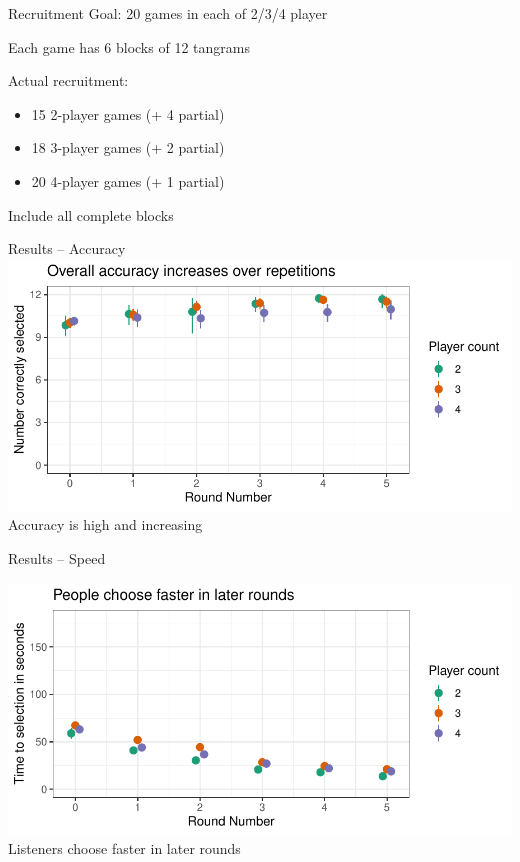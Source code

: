 \documentclass[ 12pt, xcolor=beamer,table,usenames,dvipsnames, ignorenonframetext, ngerman]{beamer}
\begin{document}
\begin{frame}{Recruitment}
	Goal: 20 games in each of 2/3/4 player 
	
	Each game has 6 blocks of 12 tangrams
	\medskip
	
	Actual recruitment:
	\begin{itemize}
		\item 15 2-player games (+ 4 partial)
		\item 18 3-player games (+ 2 partial)
		\item 20 4-player games (+ 1 partial)
	\end{itemize}
Include all complete blocks

\end{frame}


\begin{frame}{Results -- Accuracy}
	\includegraphics[width=\textwidth]{../images/accuracy.pdf}
	Accuracy is high and increasing
\end{frame}

\begin{frame}{Results -- Speed}
	
	\includegraphics[width=\textwidth]{../images/time.pdf}
	Listeners choose faster in later rounds

\end{frame}
\end{document}
